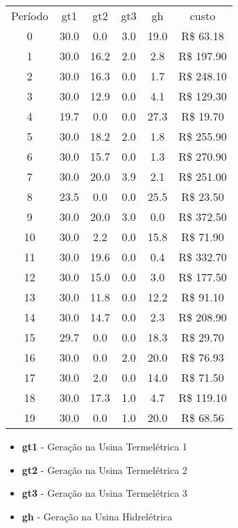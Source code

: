 \documentclass[a4paper,12pt,twoside]{article}
\begin{document}
\begin{center}
    \begin{tabular}{ c c c c c c }
        Período & gt1 & gt2 & gt3 & gh & custo \\
        0   & 30.0  &  0.0  & 3.0  & 19.0  & R\$ 63.18 \\
        1   & 30.0  & 16.2  & 2.0  &  2.8  & R\$ 197.90 \\
        2   & 30.0  & 16.3  & 0.0  &  1.7  & R\$ 248.10 \\
        3   & 30.0  & 12.9  & 0.0  &  4.1  & R\$ 129.30 \\
        4   & 19.7  &  0.0  & 0.0  & 27.3  & R\$ 19.70 \\
        5   & 30.0  & 18.2  & 2.0  &  1.8  & R\$ 255.90 \\
        6   & 30.0  & 15.7  & 0.0  &  1.3  & R\$ 270.90 \\
        7   & 30.0  & 20.0  & 3.9  &  2.1  & R\$ 251.00 \\
        8   & 23.5  &  0.0  & 0.0  & 25.5  & R\$ 23.50 \\
        9   & 30.0  & 20.0  & 3.0  &  0.0  & R\$ 372.50 \\
        10  & 30.0  &  2.2  & 0.0  & 15.8  & R\$ 71.90 \\
        11  & 30.0  & 19.6  & 0.0  &  0.4  & R\$ 332.70 \\
        12  & 30.0  & 15.0  & 0.0  &  3.0  & R\$ 177.50 \\
        13  & 30.0  & 11.8  & 0.0  & 12.2  & R\$ 91.10 \\
        14  & 30.0  & 14.7  & 0.0  &  2.3  & R\$ 208.90 \\
        15  & 29.7  &  0.0  & 0.0  & 18.3  & R\$ 29.70 \\
        16  & 30.0  &  0.0  & 2.0  & 20.0  & R\$ 76.93 \\
        17  & 30.0  &  2.0  & 0.0  & 14.0  & R\$ 71.50 \\
        18  & 30.0  & 17.3  & 1.0  &  4.7  & R\$ 119.10 \\
        19  & 30.0  &  0.0  & 1.0  & 20.0  & R\$ 68.56
    \end{tabular}
\end{center}

\begin{itemize}
    \item{\textbf{gt1} - Geração na Usina Termelétrica 1}
    \item{\textbf{gt2} - Geração na Usina Termelétrica 2}
    \item{\textbf{gt3} - Geração na Usina Termelétrica 3}
    \item{\textbf{gh} - Geração na Usina Hidrelétrica}
\end{itemize}
\end{document}
